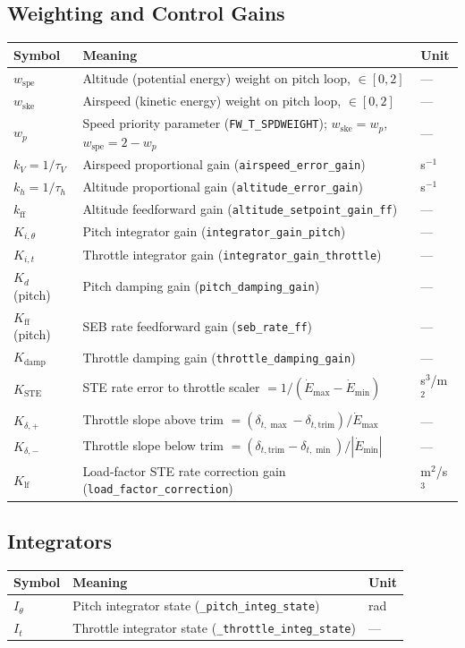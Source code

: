 \documentclass[12pt,a4paper]{article}
\begin{document}
\subsection*{Weighting and Control Gains}
\begin{center}\begin{tabular}{lll}\toprule
Symbol & Meaning & Unit \\\midrule
$w_{\text{spe}}$ & Altitude (potential energy) weight on pitch loop, $\in[0,2]$ & --- \\
$w_{\text{ske}}$ & Airspeed (kinetic energy) weight on pitch loop, $\in[0,2]$ & --- \\
$w_p$ & Speed priority parameter (\texttt{FW\_T\_SPDWEIGHT}); $w_{\text{ske}}=w_p$, $w_{\text{spe}}=2-w_p$ & --- \\
$k_V = 1/\tau_V$ & Airspeed proportional gain (\texttt{airspeed\_error\_gain}) & s$^{-1}$ \\
$k_h = 1/\tau_h$ & Altitude proportional gain (\texttt{altitude\_error\_gain}) & s$^{-1}$ \\
$k_{\text{ff}}$ & Altitude feedforward gain (\texttt{altitude\_setpoint\_gain\_ff}) & --- \\
$K_{i,\theta}$ & Pitch integrator gain (\texttt{integrator\_gain\_pitch}) & --- \\
$K_{i,t}$ & Throttle integrator gain (\texttt{integrator\_gain\_throttle}) & --- \\
$K_d$ (pitch) & Pitch damping gain (\texttt{pitch\_damping\_gain}) & --- \\
$K_{\text{ff}}$ (pitch) & SEB rate feedforward gain (\texttt{seb\_rate\_ff}) & --- \\
$K_{\text{damp}}$ & Throttle damping gain (\texttt{throttle\_damping\_gain}) & --- \\
$K_{\text{STE}}$ & STE rate error to throttle scaler $= 1/(\dot{E}_{\max}-\dot{E}_{\min})$ & s$^3$/m$^2$ \\
$K_{\delta,+}$ & Throttle slope above trim $= (\delta_{t,\max}-\delta_{t,\text{trim}})/\dot{E}_{\max}$ & --- \\
$K_{\delta,-}$ & Throttle slope below trim $= (\delta_{t,\text{trim}}-\delta_{t,\min})/|\dot{E}_{\min}|$ & --- \\
$K_{\text{lf}}$ & Load-factor STE rate correction gain (\texttt{load\_factor\_correction}) & m$^2$/s$^3$ \\
\bottomrule\end{tabular}\end{center}

\subsection*{Integrators}
\begin{center}\begin{tabular}{lll}\toprule
Symbol & Meaning & Unit \\\midrule
$I_\theta$ & Pitch integrator state (\texttt{\_pitch\_integ\_state}) & rad \\
$I_t$ & Throttle integrator state (\texttt{\_throttle\_integ\_state}) & --- \\
\bottomrule\end{tabular}\end{center}
\end{document}
